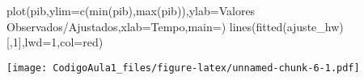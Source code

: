 \documentclass[
]{article}
\newenvironment{Shaded}{\begin{snugshade}}{\end{snugshade}}
\newcommand{\AttributeTok}[1]{\textcolor[rgb]{0.77,0.63,0.00}{#1}}
\newcommand{\DecValTok}[1]{\textcolor[rgb]{0.00,0.00,0.81}{#1}}
\newcommand{\FunctionTok}[1]{\textcolor[rgb]{0.00,0.00,0.00}{#1}}
\newcommand{\NormalTok}[1]{#1}
\newcommand{\StringTok}[1]{\textcolor[rgb]{0.31,0.60,0.02}{#1}}
\begin{document}
\begin{Shaded}
\begin{Highlighting}[]
\FunctionTok{plot}\NormalTok{(pib,}\AttributeTok{ylim=}\FunctionTok{c}\NormalTok{(}\FunctionTok{min}\NormalTok{(pib),}\FunctionTok{max}\NormalTok{(pib)),}\AttributeTok{ylab=}\StringTok{\textquotesingle{}Valores Observados/Ajustados\textquotesingle{}}\NormalTok{,}\AttributeTok{xlab=}\StringTok{\textquotesingle{}Tempo\textquotesingle{}}\NormalTok{,}\AttributeTok{main=}\StringTok{\textquotesingle{}\textquotesingle{}}\NormalTok{)}
\FunctionTok{lines}\NormalTok{(}\FunctionTok{fitted}\NormalTok{(ajuste\_hw)[,}\DecValTok{1}\NormalTok{],}\AttributeTok{lwd=}\DecValTok{1}\NormalTok{,}\AttributeTok{col=}\StringTok{\textquotesingle{}red\textquotesingle{}}\NormalTok{)}
\end{Highlighting}
\end{Shaded}

\texttt{[image: CodigoAula1\_files/figure-latex/unnamed-chunk-6-1.pdf]}
\end{document}
